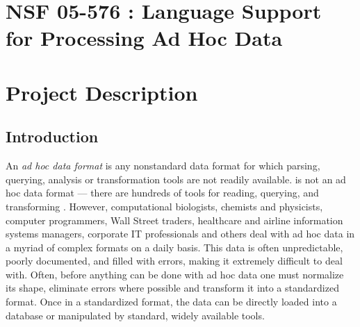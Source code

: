 \documentclass[11pt]{article}
\begin{document}
\setcounter{page}{1}
\appendix
\section{NSF 05-576 \datatype{}: Language Support for Processing Ad Hoc Data}

\newpage
\setcounter{page}{1}
\section{Project Description}

\subsection{Introduction}
\label{ssec:intro}

An {\em ad hoc data format} is any nonstandard data format for which
parsing, querying, analysis or transformation tools are not readily
available.  \xml{} is not an ad hoc data format --- there are hundreds
of tools for reading, querying, and transforming \xml{}.  However,
computational biologists, chemists and physicists, computer programmers,
Wall Street traders, healthcare and airline information systems managers,
corporate IT professionals and 
others deal with ad hoc
data in a myriad of complex formats on a daily basis.
This data is often unpredictable, poorly documented, and
filled with errors, making it extremely difficult
to deal with.  Often, before anything can be done with
ad hoc data one must normalize its shape, eliminate errors
where possible and transform it into a standardized format. 
Once in a standardized format, the data
can be directly loaded into a database or manipulated by
standard, widely available tools.  
\end{document}
